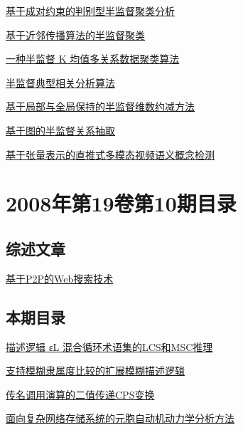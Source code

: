 \documentclass[a4paper]{article}
\begin{document}
\href{http://www.jos.org.cn/ch/reader/download_pdf.aspx?file_no=20081102&year_id=2008&quarter_id=11&falg=1}{基于成对约束的判别型半监督聚类分析}

\href{http://www.jos.org.cn/ch/reader/download_pdf.aspx?file_no=20081103&year_id=2008&quarter_id=11&falg=1}{基于近邻传播算法的半监督聚类}

\href{http://www.jos.org.cn/ch/reader/download_pdf.aspx?file_no=20081104&year_id=2008&quarter_id=11&falg=1}{一种半监督 K 均值多关系数据聚类算法}

\href{http://www.jos.org.cn/ch/reader/download_pdf.aspx?file_no=20081105&year_id=2008&quarter_id=11&falg=1}{半监督典型相关分析算法}

\href{http://www.jos.org.cn/ch/reader/download_pdf.aspx?file_no=20081106&year_id=2008&quarter_id=11&falg=1}{基于局部与全局保持的半监督维数约减方法}

\href{http://www.jos.org.cn/ch/reader/download_pdf.aspx?file_no=20081107&year_id=2008&quarter_id=11&falg=1}{基于图的半监督关系抽取}

\href{http://www.jos.org.cn/ch/reader/download_pdf.aspx?file_no=20081108&year_id=2008&quarter_id=11&falg=1}{基于张量表示的直推式多模态视频语义概念检测}


\section{\textbf{2008年第19卷第10期目录}}
\subsection{综述文章}
\href{http://www.jos.org.cn/ch/reader/download_pdf.aspx?file_no=20081022&year_id=2008&quarter_id=10&falg=1}{基于P2P的Web搜索技术}

\subsection{本期目录}
\href{http://www.jos.org.cn/ch/reader/download_pdf.aspx?file_no=20081001&year_id=2008&quarter_id=10&falg=1}{描述逻辑 εL 混合循环术语集的LCS和MSC推理}

\href{http://www.jos.org.cn/ch/reader/download_pdf.aspx?file_no=20081002&year_id=2008&quarter_id=10&falg=1}{支持模糊隶属度比较的扩展模糊描述逻辑}

\href{http://www.jos.org.cn/ch/reader/download_pdf.aspx?file_no=20081003&year_id=2008&quarter_id=10&falg=1}{传名调用演算的二值传递CPS变换}

\href{http://www.jos.org.cn/ch/reader/download_pdf.aspx?file_no=20081004&year_id=2008&quarter_id=10&falg=1}{面向复杂网络存储系统的元胞自动机动力学分析方法}
\end{document}
